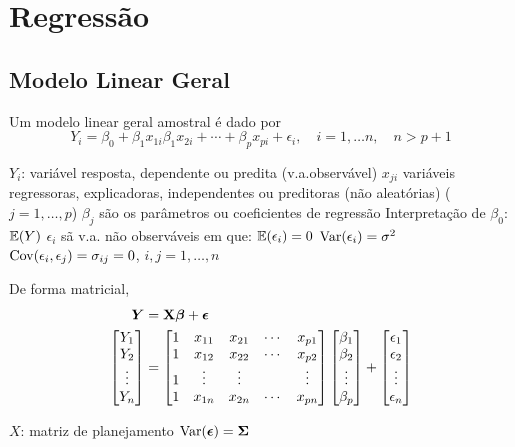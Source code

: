 \chapter{Regressão}

\section{Modelo Linear Geral}

\begin{definition}
	Um modelo linear geral amostral é dado por
	\begin{equation}
		Y_i = \beta_0 + \beta_1 x_{1i} \beta_1 x_{2i} + \cdots + \beta_p x_{pi} + \epsilon_i, \quad i=1,\ldots n, \quad n>p+1 
	\end{equation}
	\begin{outline}
		\1 $Y_i$: variável resposta, dependente ou predita (v.a.observável)
		\1 $x_{ji}$ variáveis regressoras, explicadoras, independentes ou preditoras (não aleatórias) ($j=1,\ldots,p$)
		\1 $\beta_j$ são os parâmetros ou coeficientes de regressão
			\2 Interpretação de $\beta_0$: 
				\3 $\operatorname{\mathbb{E}}(Y)$
				\3 
		\1 $\epsilon_i$ sã v.a. não observáveis em que:
			\2 $\operatorname{\mathbb{E}}(\epsilon_i)=0$
			\2 $\operatorname{Var}(\epsilon_i)=\sigma^2$
			\2 $\operatorname{Cov}(\epsilon_i, \epsilon_j)=\sigma_{ij}=0$, $i,j=1,\ldots,n$
	\end{outline}
	De forma matricial,
	\begin{align}
		\bm{Y} &= \mathbf{X} \bm{\beta} + \bm{\epsilon} \\
		\begin{bmatrix}
			Y_1 \\ Y_2 \\ \vdots \\ Y_n
		\end{bmatrix} &= 
		\begin{bmatrix}
			1 & x_{11} & x_{21} & \cdots & x_{p1} \\
			1 & x_{12} & x_{22} & \cdots & x_{p2} \\
			1 & \vdots & \vdots & & \vdots \\
			1 & x_{1n} & x_{2n} & \cdots & x_{pn} \\
		\end{bmatrix}
		\begin{bmatrix}
			\beta_1 \\ \beta_2 \\ \vdots \\ \beta_p
		\end{bmatrix} + 
		\begin{bmatrix}
			\epsilon_1 \\ \epsilon_2 \\ \vdots \\ \epsilon_n
		\end{bmatrix} 
	\end{align}
	\begin{outline}
		\1 $X$: matriz de planejamento
		\1 $\operatorname{Var}(\bm{\epsilon}) = \mathbf{\Sigma}$
	\end{outline}
\end{definition}

